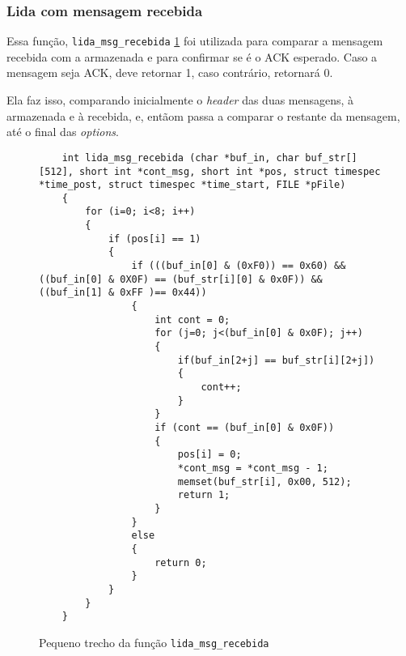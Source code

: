 \subsubsection{Lida com mensagem recebida}

Essa função, \texttt{lida\_msg\_recebida} \ref{code:lida_msg_recebida} foi utilizada para comparar a mensagem recebida com a armazenada e para confirmar se é o ACK esperado. Caso a mensagem seja ACK, deve retornar 1, caso contrário, retornará 0.

Ela faz isso, comparando inicialmente o \textit{header} das duas mensagens, à armazenada e à recebida, e, entãom passa a comparar o restante da mensagem, até o final das \textit{options}.

\begin{figure}[!htb]
	\begin{lstlisting}
	int lida_msg_recebida (char *buf_in, char buf_str[][512], short int *cont_msg, short int *pos, struct timespec *time_post, struct timespec *time_start, FILE *pFile)
	{
		for (i=0; i<8; i++)
		{
			if (pos[i] == 1)
			{
				if (((buf_in[0] & (0xF0)) == 0x60) && ((buf_in[0] & 0X0F) == (buf_str[i][0] & 0x0F)) && ((buf_in[1] & 0xFF )== 0x44))
				{
					int cont = 0;
					for (j=0; j<(buf_in[0] & 0x0F); j++)
					{
						if(buf_in[2+j] == buf_str[i][2+j])
						{
							cont++;
						}
					}
					if (cont == (buf_in[0] & 0x0F))
					{
						pos[i] = 0;
						*cont_msg = *cont_msg - 1;
						memset(buf_str[i], 0x00, 512);
						return 1;
					}
				}
				else
				{
					return 0;
				}
			}
		}
	}
	\end{lstlisting}
	\caption{Pequeno trecho da função \texttt{lida\_msg\_recebida}}
\label{code:lida_msg_recebida}
\end{figure}

\hfill \break
\hfill \break
\hfill \break
\hfill \break
\hfill \break
\hfill \break
\hfill \break
\hfill \break
\hfill \break

